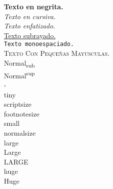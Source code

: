 \documentclass{article}
\begin{document}
\textbf{Texto en negrita.}\\

\textit{Texto en cursiva.}\\

\emph{Texto enfatizado.}\\

\underline{Texto subrayado.}\\

\texttt{Texto monoespaciado.}\\

\textsc{Texto Con Peque\~nas Mayusculas.}\\

Normal\textsubscript{sub}\\

Normal\textsuperscript{sup}\\

-\\
\tiny
tiny\\
\scriptsize
scriptsize\\
\footnotesize
footnotesize\\
\small
small\\
\normalsize
normalsize\\
\large
large\\
\Large
Large\\
\LARGE
LARGE\\
\huge
huge\\
\Huge
Huge\\
\end{document}
